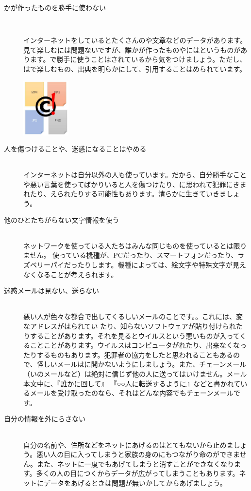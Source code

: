 \documentclass[a4paper,12pt,dvipdfmx]{jarticle}
\begin{document}
\begin{description}


	\item[かが作ったものを勝手に使わない]~\\
	\begin{minipage}[b]{0.65\textwidth}
		インターネットをしているとたくさんのや文章などのデータがあります。見て楽しむには問題ないですが、誰かが作ったものやにはというものがあります。で勝手に使うことはされているから気をつけましょう。ただし、はで楽しむもの、出典を明らかにして、引用することはめられています。
	\end{minipage}\hfill
	\includegraphics[width=0.2\textwidth]{ome7-img001}
	\item[人を傷つけることや、迷惑になることはやめる]~\\
	インターネットは自分以外の人も使っています。だから、自分勝手なことや悪い言葉を使ってばかりいると人を傷つけたり、に思われて犯罪にきまれたり、えられたりする可能性もあります。清らかに生きていきましょう。
	\item[他のひとたちがらない文字情報を使う]~\\
	ネットワークを使っている人たちはみんな同じものを使っているとは限りません。
	使っている機種が、PCだったり、スマートフォンだったり、ラズベリーパイだったりします。機種によっては、絵文字や特殊文字が見えなくなることが考えられます。
	\item[迷惑メールは見ない、送らない]~\\
	悪い人が色々な都合で出してくるしいメールのことです。。これには、変なアドレスがはられてい
	たり、知らないソフトウェアが貼り付けられたりすることがあります。それを見るとウイルスという悪いものが入ってくることことがあります。ウイルスはコンピュータがれたり、出来なくなったりするものもあります。犯罪者の協力をしたと思われることもあるので、怪しいメールはに開かないようにしましょう。また、チェーンメール（いのメールなど）は絶対に信じず他の人に送ってはいけません。メール本文中に、『誰かに回して』 『○○人に転送するように』などと書かれているメールを受け取ったのなら、それはどんな内容でもチェーンメールです。
	\item[自分の情報を外にらさない]~\\
	自分の名前や、住所などをネットにあげるのはとてもないから止めましょう。悪い人の目に入ってしまうと家族の身のにもつながり命のができません。また、ネットに一度でもあげてしまうと消すことができなくなります。多くの人の目につくからデータが広がってしまうこともあります。ネットにデータをあげるときは問題が無いかしてからあげましょう。


\end{description}
\end{document}
